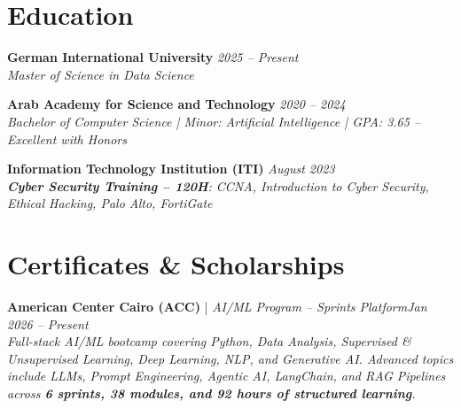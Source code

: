 \documentclass[a4paper,11pt]{article}
\newcommand{\cveducation}[3]{%
  \textbf{#1} \hfill \textit{#3} \\
  \textit{#2}
  \vspace{2pt}
}
\newcommand{\cvcert}[4]{%
  \textbf{#1} | \textit{#2}\hfill \textit{#4} \\
  \textit{#3}
  \vspace{2pt}
}
\begin{document}

\newpage

\section{Education}

\cveducation{German International University}{Master of Science in Data Science}{2025 -- Present}

\vspace{6pt}


\cveducation{Arab Academy for Science and Technology}{Bachelor of Computer Science | Minor: Artificial Intelligence | GPA: 3.65 -- Excellent with Honors}{2020 -- 2024}

\vspace{6pt}

\cveducation{Information Technology Institution (ITI)}{ \textbf{Cyber Security Training -- 120H}: CCNA, Introduction to Cyber Security, Ethical Hacking, Palo Alto, FortiGate}{August 2023}

\section{Certificates \& Scholarships}
\cvcert{American Center Cairo (ACC)}{AI/ML Program -- Sprints Platform}{
  Full-stack AI/ML bootcamp covering Python, Data Analysis, Supervised \& Unsupervised Learning, 
  Deep Learning, NLP, and Generative AI. \newline
  Advanced topics include LLMs, Prompt Engineering, Agentic AI, LangChain, and RAG Pipelines 
  across \textbf{6 sprints, 38 modules, and 92 hours of structured learning}.
}{Jan 2026 -- Present}

\vspace{4pt}

\end{document}
